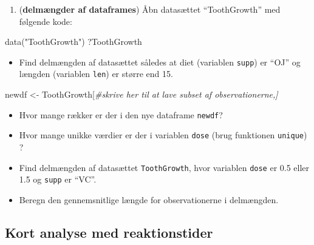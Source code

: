 \documentclass[
]{book}
\newenvironment{Shaded}{\begin{snugshade}}{\end{snugshade}}
\newcommand{\CommentTok}[1]{\textcolor[rgb]{0.56,0.35,0.01}{\textit{#1}}}
\newcommand{\FunctionTok}[1]{\textcolor[rgb]{0.00,0.00,0.00}{#1}}
\newcommand{\NormalTok}[1]{#1}
\newcommand{\OtherTok}[1]{\textcolor[rgb]{0.56,0.35,0.01}{#1}}
\newcommand{\SpecialCharTok}[1]{\textcolor[rgb]{0.00,0.00,0.00}{#1}}
\newcommand{\StringTok}[1]{\textcolor[rgb]{0.31,0.60,0.02}{#1}}
\providecommand{\tightlist}{%
  \setlength{\itemsep}{0pt}\setlength{\parskip}{0pt}}
\begin{document}
\begin{Shaded}
\end{Shaded}

\begin{enumerate}
\def\labelenumi{\arabic{enumi})}
\setcounter{enumi}{6}
\tightlist
\item
  (\textbf{delmængder af dataframes}) Åbn datasættet ``ToothGrowth'' med følgende kode:
\end{enumerate}

\begin{Shaded}
\begin{Highlighting}[]
\FunctionTok{data}\NormalTok{(}\StringTok{"ToothGrowth"}\NormalTok{)}
\NormalTok{?ToothGrowth}
\end{Highlighting}
\end{Shaded}

\begin{itemize}
\tightlist
\item
  Find delmængden af datasættet således at diet (variablen \texttt{supp}) er ``OJ'' og længden (variablen \texttt{len}) er større end 15.
\end{itemize}

\begin{Shaded}
\begin{Highlighting}[]
\NormalTok{newdf }\OtherTok{\textless{}{-}}\NormalTok{ ToothGrowth[}\CommentTok{\#skrive her til at lave subset af observationerne,]}
\end{Highlighting}
\end{Shaded}

\begin{itemize}
\tightlist
\item
  Hvor mange rækker er der i den nye dataframe \texttt{newdf}?
\item
  Hvor mange unikke værdier er der i variablen \texttt{dose} (brug funktionen \texttt{unique}) ?
\item
  Find delmængden af datasættet \texttt{ToothGrowth}, hvor variablen \texttt{dose} er 0.5 eller 1.5 og \texttt{supp} er ``VC''.
\item
  Beregn den gennemsnitlige længde for observationerne i delmængden.
\end{itemize}

\hypertarget{kort-analyse-med-reaktionstider}{%
\subsection{Kort analyse med reaktionstider}\label{kort-analyse-med-reaktionstider}}
\end{document}
